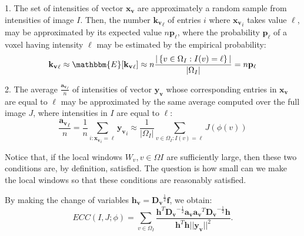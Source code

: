 1. The set of intensities of vector $\mathbf{x_{v}}$ are approximately a random sample from intensities of image $I$. Then, the number $\mathbf{k_{v}}_{\ell}$ of entries $i$ where $\mathbf{x_{v}}_{i}$ takes value $\ell$, may be approximated by its expected value $n\mathbf{p}_{\ell}$, where the probability $\mathbf{p}_{\ell}$ of a voxel having intensity $\ell$ may be estimated by the empirical probability:
\begin{equation}
    \mathbf{k_{v}}_{\ell} \approx \mathbbm{E}[\mathbf{k_{v}}_{\ell}] \approx n\frac{|\left\lbrace v\in\Omega_{I} : I(v) = \ell\right\rbrace|}{|\Omega_{I}|} = n\mathbf{p}_{\ell} 
\end{equation}

2. The average $\frac{\mathbf{a_{v}}_{\ell}}{n}$ of intensities of vector $\mathbf{y_{v}}$ whose corresponding entries in $\mathbf{x_{v}}$ are equal to $\ell$ may be approximated by the same average computed over the full image $J$, where intensities in $I$ are equal to $\ell$:
\begin{equation}
    \frac{\mathbf{a_{v}}_{\ell}}{n} =  \frac{1}{n}\sum_{i:\mathbf{x_{v}}_{i}=\ell} \mathbf{y_{v}}_{i} \approx \frac{1}{|\Omega_{I}|}\sum_{v\in\Omega_{I}: I(v)=\ell} J(\phi(v))
\end{equation}

Notice that, if the local windows $W_{v}, v\in\Omega{I}$ are sufficiently large, then these two conditions are, by definition, satisfied. The question is how small can we make the local windows so that these conditions are reasonably satisfied.

By making the change of variables $\mathbf{h_{v}} = \mathbf{D_{v}}^{\frac{1}{2}}\mathbf{f}$, we obtain:
\begin{equation}\label{eq:ecc_neg_likelihood_vector_form_simplified}
    ECC(I, J;\phi) = \sum_{v\in\Omega_{I}}\frac{\mathbf{h}^{T}\mathbf{D_{v}}^{-\frac{1}{2}}\mathbf{a_{v}}\mathbf{a_{v}}^{T}\mathbf{D_{v}}^{-\frac{1}{2}}\mathbf{h}}
    {\mathbf{h}^{T}\mathbf{h}||\mathbf{y_{v}}||^{2}}.
\end{equation}





















